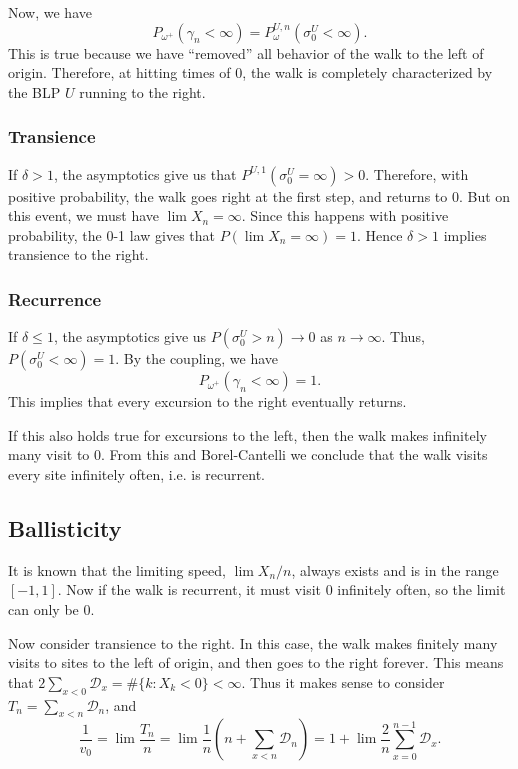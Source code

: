Now, we have
\[
	P_{\omega^+}  (\gamma_n < \infty ) = P_\omega ^{U, n} (\sigma_0^U < \infty )
.\] 
This is true because we have ``removed'' all behavior of the walk to the left of origin. Therefore, at hitting times of $0$, the walk is completely characterized by the BLP $U$ running to the right.

\subsubsection{Transience}

If $ \delta > 1$, the asymptotics give us that  $P^{U, 1}(\sigma_0^U = \infty ) > 0$. Therefore, with positive probability, the walk goes right at the first step, and returns to $0$. But on this event, we must have $\lim X_n = \infty $. Since this happens with positive probability, the 0-1 law gives that $P(\lim X_n = \infty ) = 1$. Hence $\delta > 1$ implies transience to the right.

\subsubsection{Recurrence}

If $\delta \le 1$, the asymptotics give us $P(\sigma_0^U > n) \to 0$ as $n \to \infty $.
Thus, $P(\sigma_0^U < \infty ) = 1$. By the coupling, we have
\[
	P_{\omega^+} (\gamma_n < \infty ) = 1
.\] 
This implies that every excursion to the right eventually returns.

If this also holds true for excursions to the left, then the walk makes infinitely many visit to $0$. From this and Borel-Cantelli we conclude that the walk visits every site infinitely often, i.e. is recurrent.


\subsection{Ballisticity}

It is known that the limiting speed, $\lim X_n / n$, always exists and is in the range  $[-1, 1]$. Now if the walk is recurrent, it must visit $0$ infinitely often, so the limit can only be $0$.

Now consider transience to the right. In this case, the walk makes finitely many visits to sites to the left of origin, and then goes to the right forever. This means that $2 \sum _{x < 0} \mathcal{D}_x = \# \{k: X_k < 0\} < \infty $. Thus it makes sense to consider $T_n = \sum_{x < n} \mathcal{D}_n$, and
\[
	\frac{1}{v_0} = \lim \frac{T_n}{n}=  \lim \frac{1}{n} \left(n + \sum_{x < n} \mathcal{D}_n \right)
	= 1 + \lim \frac{2}{n} \sum _{x = 0}^{n - 1} \mathcal{D}_x
.\] 

